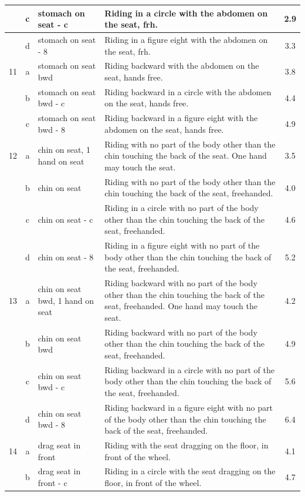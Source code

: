 \begin{longtable}{|r|c|p{4cm}|p{8cm}|c|}
\hline
  & c & stomach on seat - c & Riding in a circle with the abdomen on the seat, frh. & 2.9 \\ 
\hline
  & d & stomach on seat - 8 & Riding in a figure eight with the abdomen on the seat, frh. & 3.3 \\ 
\hline
11  & a & stomach on seat bwd & Riding backward with the abdomen on the seat, hands free. & 3.8 \\ 
\hline
  & b & stomach on seat bwd - c & Riding backward in a circle with the abdomen on the seat, hands free. & 4.4 \\ 
\hline
  & c & stomach on seat bwd - 8 & Riding backward in a figure eight with the abdomen on the seat, hands free. & 4.9 \\ 
\hline
12  & a & chin on seat, 1 hand on seat  & Riding with no part of the body other than the chin touching the back of the seat. One hand may touch the seat. & 3.5 \\ 
\hline
  & b & chin on seat  & Riding with no part of the body other than the chin touching the back of the seat, freehanded.  & 4.0 \\ 
\hline
  & c & chin on seat - c  & Riding in a circle with no part of the body other than the chin touching the back of the seat, freehanded.  & 4.6 \\ 
\hline
  & d & chin on seat - 8  & Riding in a figure eight with no part of the body other than the chin touching the back of the seat, freehanded.  & 5.2 \\ 
\hline
13  & a & chin on seat bwd, 1 hand on seat  & Riding backward with no part of the body other than the chin touching the back of the seat, freehanded. One hand may touch the seat.  & 4.2 \\ 
\hline
  & b & chin on seat bwd  & Riding backward with no part of the body other than the chin touching the back of the seat, freehanded. & 4.9 \\ 
\hline
  & c & chin on seat bwd - c  & Riding backward in a circle with no part of the body other than the chin touching the back of the seat, freehanded. & 5.6 \\ 
\hline
  & d & chin on seat bwd - 8  & Riding backward in a figure eight with no part of the body other than the chin touching the back of the seat, freehanded. & 6.4 \\ 
\hline
14  & a & drag seat in front  & Riding with the seat dragging on the floor, in front of the wheel.  & 4.1 \\ 
\hline
  & b & drag seat in front - c  & Riding in a circle with the seat dragging on the floor, in front of the wheel.  & 4.7 \\ 

\end{longtable}
